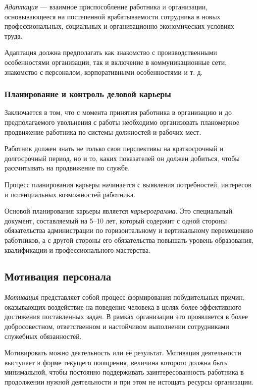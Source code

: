 \documentclass[12pt, russian, oneside, article]{ncc}
\begin{document}
\emph{Адаптация} --- взаимное приспособление работника и организации, основывающееся на постепенной врабатываемости сотрудника в новых профессиональных, социальных и организационно-экономических условиях труда.

Адаптация должна предполагать как знакомство с производственными особенностями организации, так и включение в коммуникационные сети, знакомство с персоналом, корпоративными особенностями и т. д.
\subsubsection{Планирование и контроль деловой карьеры}
\label{sec-4_2_4}


Заключается в том, что с момента принятия работника в организацию и до предполагаемого увольнения с работы необходимо организовать планомерное продвижение работника по системы должностей и рабочих мест.

Работник должен знать не только свои перспективы на краткосрочный и долгосрочный период, но и то, каких показателей он должен добиться, чтобы рассчитывать на продвижение по службе.

Процесс планирования карьеры начинается с выявления потребностей, интересов и потенциальных возможностей работника.

Основой планирования карьеры является \emph{карьерограмма}. Это специальный документ, составляемый на 5--10 лет, который содержит с одной стороны обязательства администрации по горизонтальному и вертикальному перемещению работников, а с другой стороны его обязательства повышать уровень образования, квалификации и профессионального мастерства.
\subsection{Мотивация персонала}
\label{sec-4_3}


\emph{Мотивация} представляет собой процесс формирования побудительных причин, оказывающих воздействие на поведение человека в целях более эффективного достижения поставленных задач. В рамках организации это проявляется в более добросовестном, ответственном и настойчивом выполнении сотрудниками служебных обязанностей.

Мотивировать можно деятельность или её результат. Мотивация деятельности выступает в форме текущего поощрения, величина которого должна быть минимальной, чтобы постоянно поддерживать заинтересованность работника в продолжении нужной деятельности и при этом не истощать ресурсы организации.
\end{document}
